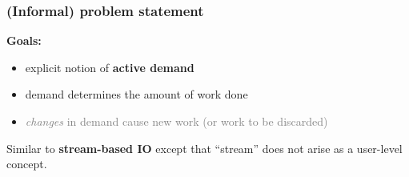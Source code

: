 \begin{frame}
\frametitle{(Informal) problem statement}
\textbf{Goals:}
\begin{itemize}
\item \pause explicit notion of \textbf{active demand}
\item \pause demand determines the amount of work done
\item \pause \textcolor{gray}{\emph{changes} in demand cause new work (or work to be discarded)}
\end{itemize}

\vspace{10pt}

\pause Similar to \textbf{stream-based IO} except that ``stream'' does
not arise as a user-level concept.
\end{frame}
